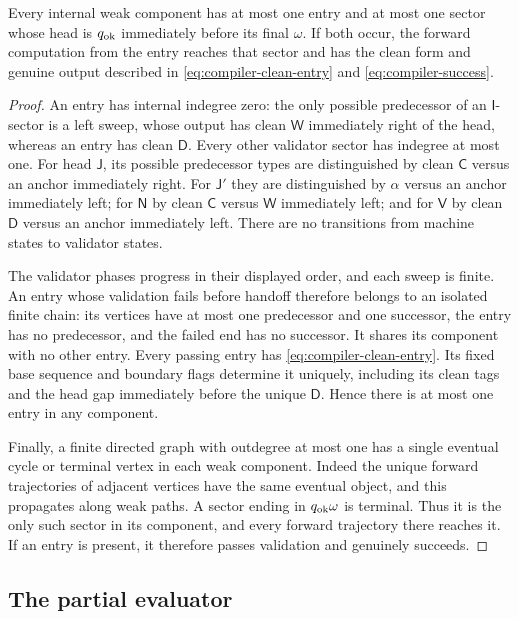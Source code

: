 \begin{lemma}\label{lem:compiler-components}
Every internal weak component has at most one entry and at most one
sector whose head is $q_{\rm ok}$ immediately before its final $\omega$.
If both occur, the forward computation from the entry reaches that
sector and has the clean form and genuine output
described in \eqref{eq:compiler-clean-entry} and
\eqref{eq:compiler-success}.
\end{lemma}
\begin{proof}
An entry has internal indegree zero: the only possible predecessor of an
$\mathsf I$-sector is a left sweep, whose output has clean $\mathsf W$
immediately right of the head, whereas an entry has clean $\mathsf D$.
Every other validator sector has indegree at most one. For head
$\mathsf J$, its possible predecessor types are distinguished by clean
$\mathsf C$ versus an anchor immediately right. For $\mathsf J'$ they
are distinguished by $\alpha$ versus an anchor immediately left; for
$\mathsf N$ by clean $\mathsf C$ versus $\mathsf W$ immediately left;
and for $\mathsf V$ by clean $\mathsf D$ versus an anchor immediately
left. There are no transitions from machine states to validator states.

The validator phases progress in their displayed order, and each sweep
is finite. An entry whose validation fails before handoff therefore
belongs to an isolated finite chain: its vertices have at most one
predecessor and one successor, the entry has no predecessor, and the
failed end has no successor. It shares its component with no other
entry. Every passing entry has
\eqref{eq:compiler-clean-entry}. Its fixed base sequence and boundary
flags determine it uniquely, including its clean tags and the head gap
immediately before the unique $\mathsf D$. Hence there is at most one
entry in any component.

Finally, a finite directed graph with outdegree at most one has a single
eventual cycle or terminal vertex in each weak component. Indeed the
unique forward trajectories of adjacent vertices have the same eventual
object, and this propagates along weak paths. A sector ending in
$q_{\rm ok}\omega$ is terminal. Thus it is the only such sector in its
component, and every forward trajectory there reaches it. If an entry
is present, it therefore passes validation and genuinely succeeds.
\end{proof}

\subsection{The partial evaluator}

